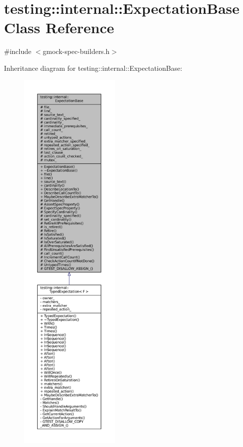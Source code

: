 \hypertarget{classtesting_1_1internal_1_1ExpectationBase}{}\section{testing\+:\+:internal\+:\+:Expectation\+Base Class Reference}
\label{classtesting_1_1internal_1_1ExpectationBase}


{\ttfamily \#include $<$gmock-\/spec-\/builders.\+h$>$}



Inheritance diagram for testing\+:\+:internal\+:\+:Expectation\+Base\+:
\nopagebreak
\begin{figure}[H]
\begin{center}
\leavevmode
\includegraphics[height=550pt]{classtesting_1_1internal_1_1ExpectationBase__inherit__graph}
\end{center}
\end{figure}


